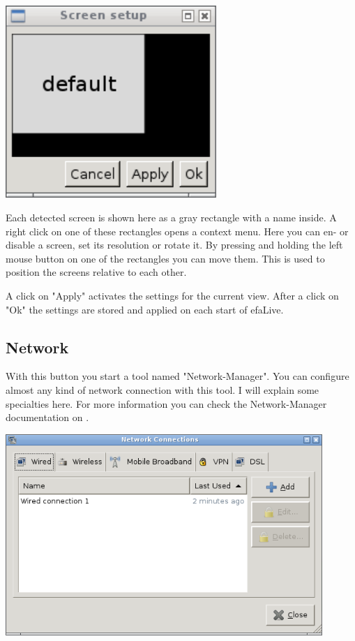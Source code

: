 \documentclass[a4paper,12pt,twoside]{article}
\begin{document}
\bigskip
\begin{minipage}{\linewidth}
    \centering
    \includegraphics[width=8cm]{efaLiveen-img/efaLiveen-img23.png}
    \label{fig:screen_setup}
\end{minipage}
\bigskip

Each detected screen is shown here as a gray rectangle with a name
inside. A right click on one of these rectangles opens a context menu.
Here you can en- or disable a screen, set its resolution or rotate it.
By pressing and holding the left mouse button on one of the rectangles
you can move them. This is used to position the screens relative to
each other.

A click on "Apply" activates the settings
for the current view. After a click on "Ok"
the settings are stored and applied on each start of efaLive.


\subsection{Network}
\label{sct:network}
With this button you start a tool named
"Network-Manager". You can configure almost
any kind of network connection with this tool. I will explain some
specialties here. For more information you can check the
Network-Manager documentation on \cite{NWM1}.

\bigskip
\begin{minipage}{\linewidth}
    \centering
    \includegraphics[width=12cm]{efaLiveen-img/efaLiveen-img24.png}
    \label{fig:dialog_network}
\end{minipage}
\end{document}
